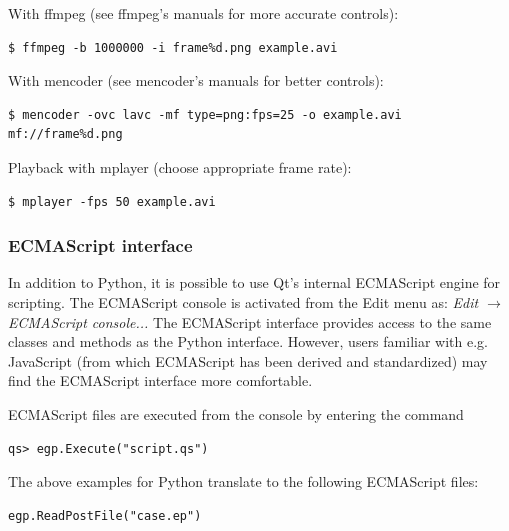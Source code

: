 \documentclass[a4paper,12pt]{article}
\newcommand{\menu}[2]{{\it \vskip2mm #1 $\rightarrow$ #2 \vskip2mm}}
\begin{document}
\vskip5mm

\vskip5mm

\noindent With ffmpeg (see ffmpeg's manuals for more accurate controls):
\begin{footnotesize}
\begin{verbatim}
$ ffmpeg -b 1000000 -i frame%d.png example.avi
\end{verbatim}
\end{footnotesize}
With mencoder (see mencoder's manuals for better controls):
\begin{footnotesize}
\begin{verbatim}
$ mencoder -ovc lavc -mf type=png:fps=25 -o example.avi mf://frame%d.png
\end{verbatim}
\end{footnotesize}
Playback with mplayer (choose appropriate frame rate):
\begin{footnotesize}
\begin{verbatim}
$ mplayer -fps 50 example.avi
\end{verbatim}
\end{footnotesize}

\subsubsection{ECMAScript interface}

In addition to Python, it is possible to use Qt's internal ECMAScript engine for scripting. The ECMAScript console is activated from
the Edit menu as:
\menu{Edit}{ECMAScript console...}
The ECMAScript interface provides access to the same classes and methods
as the Python interface. However, users familiar with e.g. JavaScript (from
which ECMAScript has been derived and standardized) may find the ECMAScript interface more comfortable.

ECMAScript files are executed from the console by entering the command
\begin{footnotesize}
\begin{verbatim}
qs> egp.Execute("script.qs")
\end{verbatim}
\end{footnotesize}

The above examples for Python translate to the following ECMAScript files:

\vskip5mm
\begin{footnotesize}
\begin{verbatim}
egp.ReadPostFile("case.ep")
\end{verbatim}
\end{footnotesize}
\end{document}
